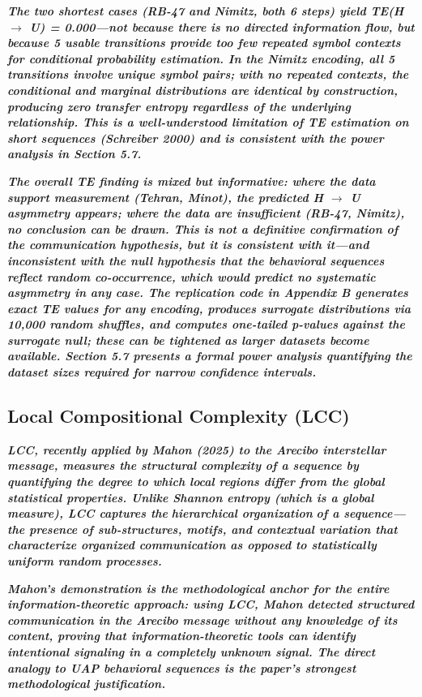 \documentclass[11pt,letterpaper]{article}
\begin{document}
\textbf{\textit{The two shortest cases (RB-47 and Nimitz, both 6 steps) yield TE(H $\rightarrow$ U) = 0.000---not because there is no directed information flow, but because 5 usable transitions provide too few repeated symbol contexts for conditional probability estimation. In the Nimitz encoding, all 5 transitions involve unique symbol pairs; with no repeated contexts, the conditional and marginal distributions are identical by construction, producing zero transfer entropy regardless of the underlying relationship. This is a well-understood limitation of TE estimation on short sequences (Schreiber 2000) and is consistent with the power analysis in Section 5.7.}}


\textbf{\textit{The overall TE finding is mixed but informative: where the data support measurement (Tehran, Minot), the predicted H $\rightarrow$ U asymmetry appears; where the data are insufficient (RB-47, Nimitz), no conclusion can be drawn. This is not a definitive confirmation of the communication hypothesis, but it is consistent with it---and inconsistent with the null hypothesis that the behavioral sequences reflect random co-occurrence, which would predict no systematic asymmetry in any case. The replication code in Appendix B generates exact TE values for any encoding, produces surrogate distributions via 10,000 random shuffles, and computes one-tailed p-values against the surrogate null; these can be tightened as larger datasets become available. Section 5.7 presents a formal power analysis quantifying the dataset sizes required for narrow confidence intervals.}}


\subsection{Local Compositional Complexity (LCC)}

\textbf{\textit{LCC, recently applied by Mahon (2025) to the Arecibo interstellar message, measures the structural complexity of a sequence by quantifying the degree to which local regions differ from the global statistical properties. Unlike Shannon entropy (which is a global measure), LCC captures the }}\textbf{\textit{hierarchical organization}}\textbf{\textit{ of a sequence---the presence of sub-structures, motifs, and contextual variation that characterize organized communication as opposed to statistically uniform random processes.}}


\textbf{\textit{Mahon's demonstration is the methodological anchor for the entire information-theoretic approach: using LCC, Mahon detected structured communication in the Arecibo message without any knowledge of its content, proving that information-theoretic tools can identify intentional signaling in a completely unknown signal. The direct analogy to UAP behavioral sequences is the paper's strongest methodological justification.}}
\end{document}
